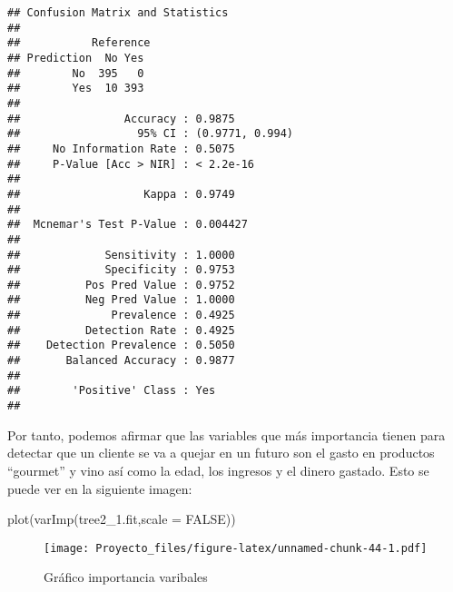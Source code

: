 \documentclass[
]{article}
\newenvironment{Shaded}{\begin{snugshade}}{\end{snugshade}}
\newcommand{\AttributeTok}[1]{\textcolor[rgb]{0.77,0.63,0.00}{#1}}
\newcommand{\ConstantTok}[1]{\textcolor[rgb]{0.00,0.00,0.00}{#1}}
\newcommand{\FunctionTok}[1]{\textcolor[rgb]{0.00,0.00,0.00}{#1}}
\newcommand{\NormalTok}[1]{#1}
\begin{document}
\begin{verbatim}
## Confusion Matrix and Statistics
## 
##           Reference
## Prediction  No Yes
##        No  395   0
##        Yes  10 393
##                                          
##                Accuracy : 0.9875         
##                  95% CI : (0.9771, 0.994)
##     No Information Rate : 0.5075         
##     P-Value [Acc > NIR] : < 2.2e-16      
##                                          
##                   Kappa : 0.9749         
##                                          
##  Mcnemar's Test P-Value : 0.004427       
##                                          
##             Sensitivity : 1.0000         
##             Specificity : 0.9753         
##          Pos Pred Value : 0.9752         
##          Neg Pred Value : 1.0000         
##              Prevalence : 0.4925         
##          Detection Rate : 0.4925         
##    Detection Prevalence : 0.5050         
##       Balanced Accuracy : 0.9877         
##                                          
##        'Positive' Class : Yes            
## 
\end{verbatim}

Por tanto, podemos afirmar que las variables que más importancia tienen
para detectar que un cliente se va a quejar en un futuro son el gasto en
productos ``gourmet'' y vino así como la edad, los ingresos y el dinero
gastado. Esto se puede ver en la siguiente imagen:

\begin{Shaded}
\begin{Highlighting}[]
\FunctionTok{plot}\NormalTok{(}\FunctionTok{varImp}\NormalTok{(tree2\_1.fit,}\AttributeTok{scale =} \ConstantTok{FALSE}\NormalTok{))}
\end{Highlighting}
\end{Shaded}

\begin{figure}
\centering
\texttt{[image: Proyecto\_files/figure-latex/unnamed-chunk-44-1.pdf]}
\caption{Gráfico importancia varibales}
\end{figure}

\newpage
\tableoffigures
\newpage
\end{document}
